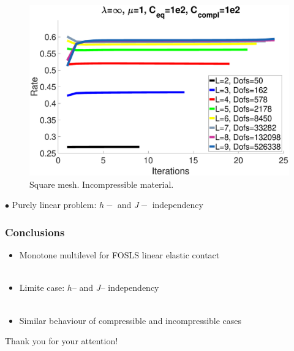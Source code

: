 \documentclass[8pt, oneside]{beamer}   	%
\newcommand{\titlecolor}[1]{\frametitle{\textcolor{dkgrey}{ \textbf{#1}}}}
\begin{document}
\begin{frame}
\begin{figure}[htbp!]
	\quad
		\includegraphics[scale=0.08]{img/SquareRateIncompressible.eps}
	\caption{Square mesh. Incompressible material.}
	\label{ResidualRateSquare}	
	\end{figure}
	$\bullet$ Purely linear problem: $h-$ and $J-$ independency
\end{frame}





\begin{frame}
\titlecolor{Conclusions}
\begin{itemize}
\item Monotone multilevel for FOSLS linear elastic contact 
${}$\\${}$\\
\item Limite case: $h$-- and $J$-- independency
${}$\\${}$\\
\item Similar behaviour of compressible and incompressible cases
\end{itemize}
\end{frame}




\begin{frame}
\centering
\huge
Thank you for your attention!
\end{frame}

\begin{frame}
\end{frame}
\begin{frame}
\end{frame}
\end{document}
